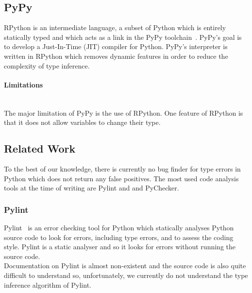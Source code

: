 \documentclass[12pt, titlepage]{article}
\begin{document}
\subsection{PyPy}
RPython is an intermediate language, a subset of Python which is entirely statically typed and which acts as a link in the PyPy toolchain~\cite{pypyRpython}. PyPy's goal is to develop a Just-In-Time (JIT) compiler for Python. PyPy's interpreter is written in RPython which removes dynamic features in order to reduce the complexity of type inference.
\paragraph{Limitations}\mbox{}\\
The major limitation of PyPy is the use of RPython. One feature of RPython is that it does not allow variables to change their type.

\subsection{Related Work}
To the best of our knowledge, there is currently no bug finder for type errors in Python which does not return any false positives. The most used code analysis tools at the time of writing are Pylint and and PyChecker.

\subsubsection{Pylint}
Pylint~\cite{pylint} is an error checking tool for Python which statically analyses Python source code to look for errors, including type errors, and to assess the coding style. Pylint is a static analyser and so it looks for errors without running the source code. \\
\indent Documentation on Pylint is almost non-existent and the source code is also quite difficult to understand so, unfortunately, we currently do not understand the type inference algorithm of Pylint.
\end{document}
